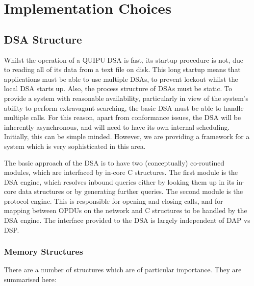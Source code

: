 
\chapter {Implementation Choices}

\section {DSA Structure}

Whilst the operation of a QUIPU DSA is fast, its
startup procedure is not, due to reading all of its data from a text file on
disk.
This long startup means that applications must be able to use
multiple DSAs, to prevent lockout whilst the local DSA starts up.
Also, the process structure of DSAs must be static.
To provide a system with reasonable availability, particularly in view of
the system's ability to perform extravagant searching, the basic
DSA must be able to handle multiple calls.
For this reason, apart from conformance issues, the DSA will be inherently
asynchronous, and will need to have its own internal scheduling.
Initially, this can be simple minded.
However, we are providing a framework for a system which is very
sophisticated in this area.

The basic approach of the DSA is to have two (conceptually) co-routined modules, which are
interfaced by in-core C structures.
The first module is the DSA engine, which resolves inbound queries either
by looking them up in its in-core data structures or by generating further
queries.
The second module is the protocol engine.
This is responsible for opening and closing calls, and for mapping between
OPDUs on the network and C structures to be handled by the DSA engine.
The interface provided to the DSA is largely independent of DAP vs DSP.

\subsection {Memory Structures}

There are a number of structures which are of particular importance.
They are summarised here:

